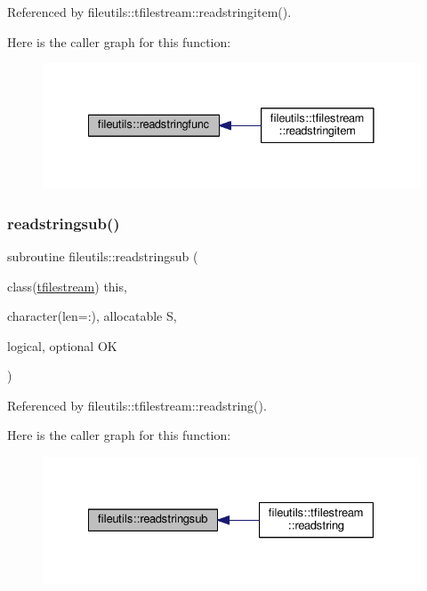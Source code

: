 Referenced by fileutils\+::tfilestream\+::readstringitem().

Here is the caller graph for this function\+:
\nopagebreak
\begin{figure}[H]
\begin{center}
\leavevmode
\includegraphics[width=332pt]{namespacefileutils_a8b83c2f06ad952435c760ce789a1b01e_icgraph}
\end{center}
\end{figure}
\mbox{\label{namespacefileutils_a436d1ea1bb13200971bcbef4e268f503}} 
\subsubsection{\texorpdfstring{readstringsub()}{readstringsub()}}
{\footnotesize\ttfamily subroutine fileutils\+::readstringsub (\begin{DoxyParamCaption}\item[{class(\mbox{\hyperlink{structfileutils_1_1tfilestream}{tfilestream}})}]{this,  }\item[{character(len=\+:), allocatable}]{S,  }\item[{logical, optional}]{OK }\end{DoxyParamCaption})\hspace{0.3cm}{\ttfamily [private]}}



Referenced by fileutils\+::tfilestream\+::readstring().

Here is the caller graph for this function\+:
\nopagebreak
\begin{figure}[H]
\begin{center}
\leavevmode
\includegraphics[width=328pt]{namespacefileutils_a436d1ea1bb13200971bcbef4e268f503_icgraph}
\end{center}
\end{figure}
\mbox{\label{namespacefileutils_ade8cd999a137d0402f901977ef1441c0}} 
